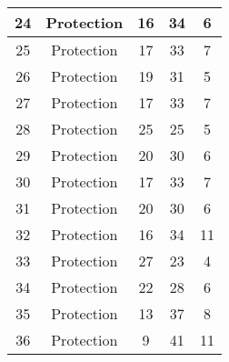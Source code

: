 \documentclass[results.tex]{subfiles}
\begin{document}
\begin{center}
\begin{tabular}{| c || c | c | c | c |}
            \hline
            24                      & Protection                   & 16                     & 34                      & 6                    \\
            \hline
            25                      & Protection                   & 17                     & 33                      & 7                    \\
            \hline
            26                      & Protection                   & 19                     & 31                      & 5                    \\
            \hline
            27                      & Protection                   & 17                     & 33                      & 7                    \\
            \hline
            28                      & Protection                   & 25                     & 25                      & 5                    \\
            \hline
            29                      & Protection                   & 20                     & 30                      & 6                    \\
            \hline
            30                      & Protection                   & 17                     & 33                      & 7                    \\
            \hline
            31                      & Protection                   & 20                     & 30                      & 6                    \\
            \hline
            32                      & Protection                   & 16                     & 34                      & 11                   \\
            \hline
            33                      & Protection                   & 27                     & 23                      & 4                    \\
            \hline
            34                      & Protection                   & 22                     & 28                      & 6                    \\
            \hline
            35                      & Protection                   & 13                     & 37                      & 8                    \\
            \hline
            36                      & Protection                   & 9                      & 41                      & 11                   \\

\end{tabular}
\end{center}
\end{document}
